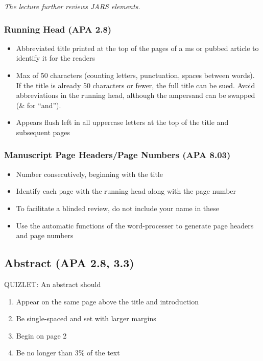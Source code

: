 \documentclass[
  english,
]{book}
\providecommand{\tightlist}{%
  \setlength{\itemsep}{0pt}\setlength{\parskip}{0pt}}
\begin{document}
\emph{The lecture further reviews JARS elements.}

\hypertarget{running-head-apa-2.8}{%
\subsubsection{Running Head (APA 2.8)}\label{running-head-apa-2.8}}

\begin{itemize}
\tightlist
\item
  Abbreviated title printed at the top of the pages of a ms or pubbed article to identify it for the readers
\item
  Max of 50 characters (counting letters, punctuation, spaces between words). If the title is already 50 characters or fewer, the full title can be sued. Avoid abbreviations in the running head, although the ampersand can be swapped (\& for ``and'').
\item
  Appears flush left in all uppercase letters at the top of the title and subsequent pages
\end{itemize}

\hypertarget{manuscript-page-headerspage-numbers-apa-8.03}{%
\subsubsection{Manuscript Page Headers/Page Numbers (APA 8.03)}\label{manuscript-page-headerspage-numbers-apa-8.03}}

\begin{itemize}
\tightlist
\item
  Number consecutively, beginning with the title
\item
  Identify each page with the running head along with the page number
\item
  To facilitate a blinded review, do not include your name in these
\item
  Use the automatic functions of the word-processer to generate page headers and page numbers
\end{itemize}

\hypertarget{abstract-apa-2.8-3.3}{%
\subsection{Abstract (APA 2.8, 3.3)}\label{abstract-apa-2.8-3.3}}

QUIZLET:
An abstract should

\begin{enumerate}
\def\labelenumi{\alph{enumi}.}
\tightlist
\item
  Appear on the same page above the title and introduction
\item
  Be single-spaced and set with larger margins
\item
  Begin on page 2
\item
  Be no longer than 3\% of the text
\end{enumerate}
\end{document}
